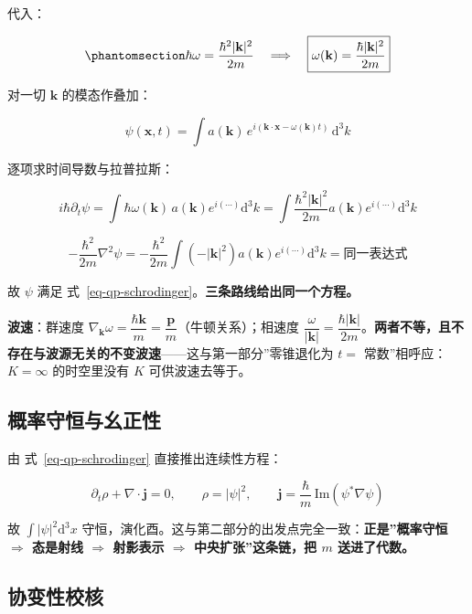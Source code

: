 \documentclass[
  chinese,
  a4paper,
  UTF8,
  12pt,
  oneside,
  openany]{ctexbook}
\theoremstyle{plain}
\theoremstyle{plain}
\theoremstyle{plain}
\theoremstyle{definition}
\theoremstyle{plain}
\theoremstyle{plain}
\theoremstyle{remark}
\begin{document}
代入：

\begin{equation}\protect\phantomsection\label{eq-qp-omega}{
\hbar\omega=\frac{\hbar^{2}\lvert\mathbf k\rvert^{2}}{2m}\quad\Longrightarrow\quad
\boxed{\omega(\mathbf k)=\frac{\hbar\lvert\mathbf k\rvert^{2}}{2m}}
}\end{equation}

对一切 \(\mathbf k\) 的模态作叠加：

\[
\psi(\mathbf x,t)=\int a(\mathbf k)\,e^{i(\mathbf k\cdot\mathbf x-\omega(\mathbf k)t)}\,\mathrm d^{3}k
\]

逐项求时间导数与拉普拉斯：

\[
i\hbar\partial_t\psi=\int \hbar\omega(\mathbf k)\,a(\mathbf k)e^{i(\cdots)}\mathrm d^{3}k
=\int\frac{\hbar^{2}\lvert\mathbf k\rvert^{2}}{2m}a(\mathbf k)e^{i(\cdots)}\mathrm d^{3}k
\]

\[
-\frac{\hbar^{2}}{2m}\nabla^{2}\psi
=-\frac{\hbar^{2}}{2m}\int(-\lvert\mathbf k\rvert^{2})a(\mathbf k)e^{i(\cdots)}\mathrm d^{3}k
=\text{同一表达式}
\]

故 \(\psi\) 满足
式~\ref{eq-qp-schrodinger}。\textbf{三条路线给出同一个方程。}

\textbf{波速}：群速度
\(\nabla_{\mathbf k}\omega=\dfrac{\hbar\mathbf k}{m}=\dfrac{\mathbf p}{m}\)（牛顿关系）；相速度
\(\dfrac{\omega}{\lvert\mathbf k\rvert}=\dfrac{\hbar\lvert\mathbf k\rvert}{2m}\)。\textbf{两者不等，且不存在与波源无关的不变波速}------这与第一部分''零锥退化为
\(t=\) 常数''相呼应：\(K=\infty\) 的时空里没有 \(K\) 可供波速去等于。

\subsection{概率守恒与幺正性}\label{ux6982ux7387ux5b88ux6052ux4e0eux5e7aux6b63ux6027}

由 式~\ref{eq-qp-schrodinger} 直接推出连续性方程：

\[
\partial_t\rho+\nabla\cdot\mathbf j=0,\qquad
\rho=\lvert\psi\rvert^{2},\qquad
\mathbf j=\frac{\hbar}{m}\,\mathrm{Im}\!\left(\psi^{*}\nabla\psi\right)
\]

故 \(\int\lvert\psi\rvert^{2}\mathrm d^{3}x\)
守恒，演化酉。这与第二部分的出发点完全一致：\textbf{正是''概率守恒
\(\Rightarrow\) 态是射线 \(\Rightarrow\) 射影表示 \(\Rightarrow\)
中央扩张''这条链，把 \(m\) 送进了代数。}

\subsection{协变性校核}\label{ux534fux53d8ux6027ux6821ux6838}
\end{document}
